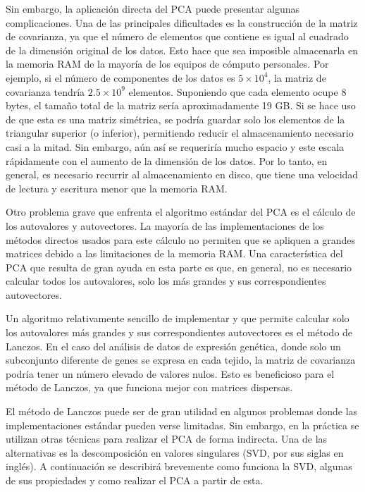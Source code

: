 Sin embargo, la aplicación directa del PCA puede presentar algunas complicaciones. Una de las principales dificultades es la construcción de la matriz de covarianza, ya que el número de elementos que contiene es igual al cuadrado de la dimensión original de los datos. Esto hace que sea imposible almacenarla en la memoria RAM de la mayoría de los equipos de cómputo personales. Por ejemplo, si el número de componentes de los datos es $5 \times 10^4$, la matriz de covarianza tendría $2.5 \times 10^9$ elementos. Suponiendo que cada elemento ocupe 8 bytes, el tamaño total de la matriz sería aproximadamente 19 GB. Si se hace uso de que esta es una matriz simétrica, se podría guardar solo los elementos de la triangular superior (o inferior), permitiendo reducir el almacenamiento necesario casi a la mitad. Sin embargo, aún así se requeriría mucho espacio y este escala rápidamente con el aumento de la dimensión de los datos. Por lo tanto, en general, es necesario recurrir al almacenamiento en disco, que tiene una velocidad de lectura y escritura menor que la memoria RAM.

Otro problema grave que enfrenta el algoritmo estándar del PCA es el cálculo de los autovalores y autovectores. La mayoría de las implementaciones de los métodos directos usados para este cálculo no permiten que se apliquen a grandes matrices debido a las limitaciones de la memoria RAM. Una característica del PCA que resulta de gran ayuda en esta parte es que, en general, no es necesario calcular todos los autovalores, solo los más grandes y sus correspondientes autovectores.

Un algoritmo relativamente sencillo de implementar y que permite calcular solo los autovalores más grandes y  sus correspondientes autovectores es el método de Lanczos. En el caso del análisis de datos de expresión genética, donde solo un subconjunto diferente de genes se expresa en cada tejido, la matriz de covarianza podría tener un número elevado de valores nulos. Esto es beneficioso para el método de Lanczos, ya que funciona mejor con matrices dispersas.

El método de Lanczos puede ser de gran utilidad en algunos problemas donde las implementaciones estándar pueden verse limitadas. Sin embargo, en la práctica se utilizan otras técnicas para realizar el PCA de forma indirecta. Una de las alternativas es la descomposición en valores singulares (SVD, por sus siglas en inglés). %
A continuación se describirá brevemente como funciona la SVD, algunas de sus propiedades y como realizar el PCA a partir de esta.

